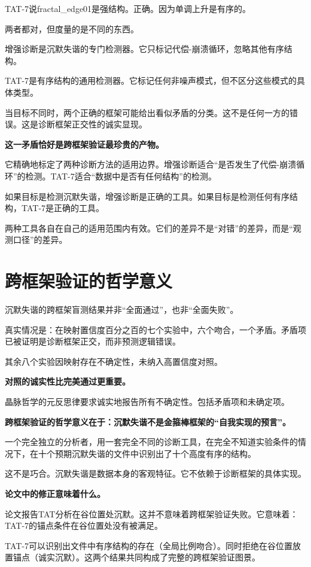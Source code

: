 \documentclass[11pt,a4paper]{book}
\theoremstyle{definition}
\begin{document}
TAT-7说fractal\_edge01是强结构。正确。因为单调上升是有序的。

两者都对，但度量的是不同的东西。

增强诊断是沉默失谐的专门检测器。它只标记代偿-崩溃循环，忽略其他有序结构。

TAT-7是有序结构的通用检测器。它标记任何非噪声模式，但不区分这些模式的具体类型。

当目标不同时，两个正确的框架可能给出看似矛盾的分类。这不是任何一方的错误。这是诊断框架正交性的诚实显现。

\textbf{这一矛盾恰好是跨框架验证最珍贵的产物。}

它精确地标定了两种诊断方法的适用边界。增强诊断适合“是否发生了代偿-崩溃循环”的检测。TAT-7适合“数据中是否有任何结构”的检测。

如果目标是检测沉默失谐，增强诊断是正确的工具。如果目标是检测任何有序结构，TAT-7是正确的工具。

两种工具各自在自己的适用范围内有效。它们的差异不是“对错”的差异，而是“观测口径”的差异。

\section{跨框架验证的哲学意义}

沉默失谐的跨框架盲测结果并非“全面通过”，也非“全面失败”。

真实情况是：在映射置信度百分之百的七个实验中，六个吻合，一个矛盾。矛盾项已被证明是诊断框架正交，而非预测逻辑错误。

其余八个实验因映射存在不确定性，未纳入高置信度对照。

\textbf{对照的诚实性比完美通过更重要。}

晶脉哲学的元反思律要求诚实地报告所有不确定性。包括矛盾项和未确定项。

\textbf{跨框架验证的哲学意义在于：沉默失谐不是金箍棒框架的“自我实现的预言”。}

一个完全独立的分析者，用一套完全不同的诊断工具，在完全不知道实验条件的情况下，在十个预期沉默失谐的文件中识别出了十个高度有序的结构。

这不是巧合。沉默失谐是数据本身的客观特征。它不依赖于诊断框架的具体实现。

\textbf{论文中的修正意味着什么。}

论文报告TAT分析在谷位置处沉默。这并不意味着跨框架验证失败。它意味着：TAT-7的锚点条件在谷位置处没有被满足。

TAT-7可以识别出文件中有序结构的存在（全局比例吻合）。同时拒绝在谷位置放置锚点（诚实沉默）。这两个结果共同构成了完整的跨框架验证图景。
\end{document}
